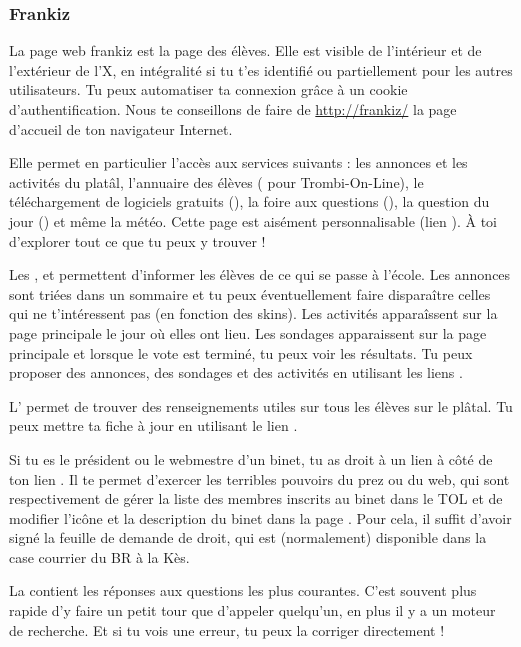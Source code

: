 \subsubsection{Frankiz}
\label{frankiz}
La page web frankiz est la page des \'el\`eves.
Elle est visible de l'int\'erieur et de l'ext\'erieur de l'X,
en int\'egralit\'e si tu t'es identifi\'e ou partiellement pour les autres utilisateurs.
Tu peux automatiser ta connexion gr\^ace \`a un cookie d'authentification.
Nous te conseillons de faire de \url{http://frankiz/} la page d'accueil de ton navigateur Internet.

Elle permet en particulier l'acc\`es aux services suivants :
les annonces et les activit\'es du plat\^al, l'annuaire des \'el\`eves ( pour Trombi-On-Line),
le t\'el\'echargement de logiciels gratuits (), la foire aux questions (),
la question du jour () et m\^eme la m\'et\'eo.
Cette page est ais\'ement personnalisable (lien ).
\`A toi d'explorer tout ce que tu peux y trouver !

Les ,  et  permettent d'informer les \'el\`eves
de ce qui se passe \`a l'\'ecole.
Les annonces sont tri\'ees dans un sommaire et tu peux \'eventuellement faire dispara\^itre
celles qui ne t'int\'eressent pas (en fonction des skins).
Les activit\'es appara\^issent sur la page principale le jour o\`u elles ont lieu.
Les sondages apparaissent sur la page principale et lorsque le vote est termin\'e, tu peux voir les r\'esultats.
Tu peux proposer des annonces, des sondages et des activit\'es en utilisant les liens .

L' permet de trouver des renseignements utiles sur tous les \'el\`eves sur le pl\^atal.
Tu peux mettre ta fiche \`a jour en utilisant le lien .

Si tu es le pr\'esident ou le webmestre d'un binet,
tu as droit \`a un lien  \`a c\^ot\'e de ton lien .
Il te permet d'exercer les terribles pouvoirs du prez ou du web,
qui sont respectivement de g\'erer la liste des membres inscrits au binet dans le TOL
et de modifier l'ic\^one et la description du binet dans la page .
Pour cela, il suffit d'avoir sign\'e la feuille de demande de droit,
qui est (normalement) disponible dans la case courrier du BR \`a la K\`es.

La  contient les r\'eponses aux questions les plus courantes.
C'est souvent plus rapide d'y faire un petit tour que d'appeler quelqu'un,
en plus il y a un moteur de recherche.
Et si tu vois une erreur, tu peux la corriger directement !


